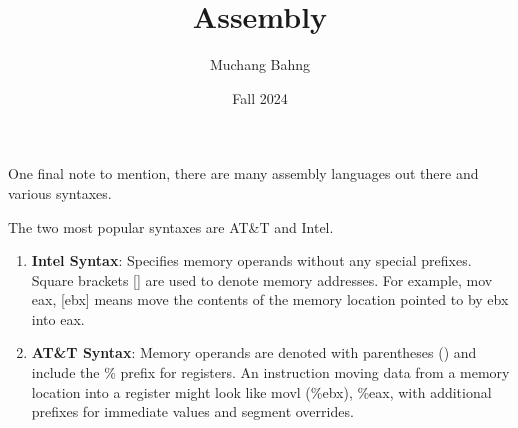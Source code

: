 \documentclass{article}
\begin{document}
\title{Assembly}
\author{Muchang Bahng}
\date{Fall 2024}

\maketitle
\tableofcontents
\pagebreak

  One final note to mention, there are many assembly languages out there and various syntaxes. 

  \begin{example}
    The two most popular syntaxes are AT\&T and Intel. 
    \begin{enumerate}
      \item \textbf{Intel Syntax}: Specifies memory operands without any special prefixes. Square brackets [] are used to denote memory addresses. For example, mov eax, [ebx] means move the contents of the memory location pointed to by ebx into eax.

      \item \textbf{AT\&T Syntax}: Memory operands are denoted with parentheses () and include the \% prefix for registers. An instruction moving data from a memory location into a register might look like movl (\%ebx), \%eax, with additional prefixes for immediate values and segment overrides.
    \end{enumerate}
  \end{example}
\end{document}
